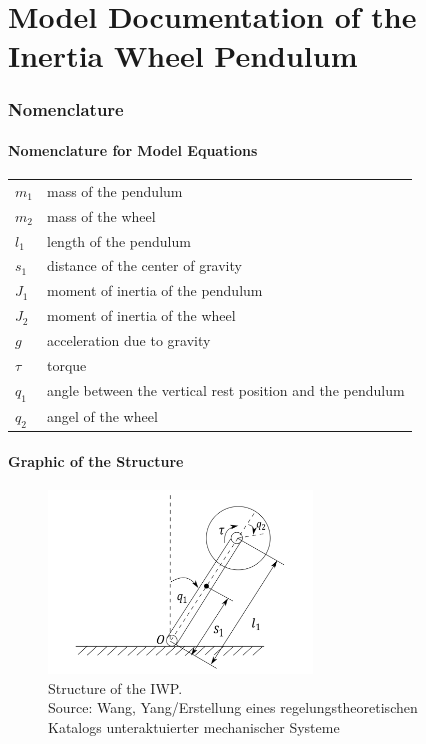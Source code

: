 \documentclass[10pt,a4paper]{article}
\begin{document}
	\part*{Model Documentation of the \\ Inertia Wheel Pendulum} %
	
	
	\section{Nomenclature} %
	\subsection{Nomenclature for Model Equations} %
	
	\begin{tabular}{ll}
		$m_1$ & mass of the pendulum \\
		$m_2$ & mass of the wheel \\
		$l_1$ & length of the pendulum \\
		$s_1$ & distance of the center of gravity \\
		$J_1$ & moment of inertia of the pendulum \\
		$J_2$ & moment of inertia of the wheel \\		
		$g$ & acceleration due to gravity \\
		$\tau$ & torque \\
		$q_1$ & angle between the vertical rest position and the pendulum  \\
		$q_2$ & angel of the wheel \\
		
				
	\end{tabular}
	 
	
	\subsection{Graphic of the Structure}	
	\begin{figure}[H]
		\centering
		\captionsetup{justification=centering, margin=1cm}
		\includegraphics[width=70mm]{iwp.pdf}
		\caption{Structure of the IWP. \\ \footnotesize{Source: Wang, Yang/Erstellung eines regelungstheoretischen Katalogs unteraktuierter mechanischer Systeme}}
	\end{figure}
	
\end{document}
